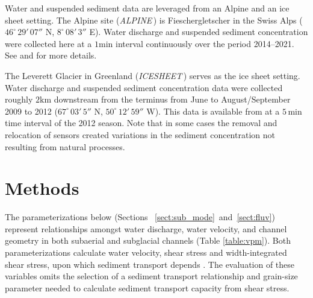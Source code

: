 \documentclass[11pt]{article}
\newcommand{\alpine}{\textit{ALPINE}\,}
\newcommand{\icesheet}{\textit{ICESHEET}\,}
\newcommand{\unit}[1]{$\mathrm{#1}$}
\begin{document}
Water and suspended sediment data are leveraged from an Alpine and an ice sheet setting.
The Alpine site (\alpine) is  Fieschergletscher in the Swiss Alps ($46^\circ\,29'\,07''$ N, $8^\circ\,08'\,3''$ E).
Water discharge and suspended sediment concentration were collected here at a $1$\unit{min} interval continuously over the period 2014--2021.
See \citet{felix2022} and \citet{felix2021} for more details.

The Leverett Glacier in Greenland (\icesheet) serves as the ice sheet setting.
Water discharge and suspended sediment concentration data were collected roughly $2$\unit{km} downstream from the terminus from June to August/September 2009 to 2012 ($67^\circ\,03'\,5''$ N, $50^\circ\,12'\,59''$ W).
This data is available from \citet{tedstone2017} at a $5$\,\unit{min} time interval of the 2012 season.
Note that in some cases the removal and relocation of sensors created variations in the sediment concentration not resulting from natural processes.

\section{Methods}
\label{sect:meth}
The parameterizations below (Sections ~\ref{sect:sub_mode}~and~\ref{sect:fluv}) represent relationships amongst water discharge, water velocity, and channel geometry in both subaerial and subglacial channels (Table \ref{table:vpm}).
Both parameterizations calculate   water velocity, shear stress and width-integrated shear stress, upon which sediment transport depends \citep[Figure \ref{fig:cartoon}; ][]{shields1936}.
The evaluation of these variables omits the selection of a sediment transport relationship and grain-size parameter \citep[e.g.][]{shields1936,meyer1948} needed to calculate sediment transport capacity from shear stress.
\end{document}
